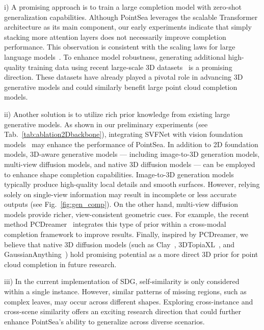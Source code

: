 i) A promising approach is to train a large completion model with zero-shot generalization capabilities. Although PointSea leverages the scalable Transformer architecture as its main component, our early experiments indicate that simply stacking more attention layers does not necessarily improve completion performance. This observation is consistent with the scaling laws for large language models~\citep{kaplan2020scaling}. To enhance model robustness, generating additional high-quality training data using recent large-scale 3D datasets~\citep{objaverse, objaverseXL, yu2023mvimgnet} is a promising direction. These datasets have already played a pivotal role in advancing 3D generative models and could similarly benefit large point cloud completion models.


ii) Another solution is to utilize rich prior knowledge from existing large generative models.  As shown in our preliminary experiments (see Tab.~\ref{tab:ablation2Dbackbone}), integrating SVFNet with vision foundation models~\citep{lama,latentdiffusion,controlnet} may enhance the performance of PointSea.
In addition to 2D foundation models, 3D-aware generative models — including image-to-3D generation models, multi-view diffusion models, and native 3D diffusion models — can be employed to enhance shape completion capabilities.
Image-to-3D generation models typically produce high-quality local details and smooth surfaces. However, relying solely on single-view information may result in incomplete or less accurate outputs (see Fig.~\ref{fig:gen_comp}).
On the other hand, multi-view diffusion models provide richer, view-consistent geometric cues. For example, the recent method PCDreamer~\citep{wei2024pcdreamer} integrates this type of prior within a cross-modal completion framework to improve results.
Finally, inspired by PCDreamer, we believe that native 3D diffusion models (such as Clay~\citep{zhang2024clay}, 3DTopiaXL~\citep{chen2024primx}, and GaussianAnything~\citep{lan2024ga}) hold promising potential as a more direct 3D prior for point cloud completion in future research.

iii) In the current implementation of SDG, self-similarity is only considered within a single instance. However, similar patterns of missing regions, such as complex leaves, may occur across different shapes. Exploring cross-instance and cross-scene similarity offers an exciting research direction that could further enhance PointSea's ability to generalize across diverse scenarios.  




